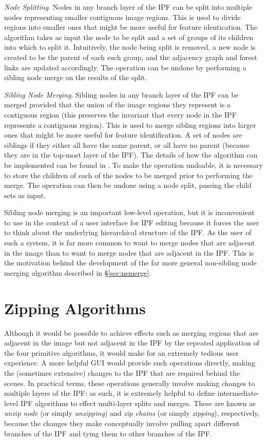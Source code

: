 \documentclass[a4paper]{article}
\begin{document}
\emph{Node Splitting}. Nodes in any branch layer of the IPF can be split into multiple nodes representing smaller contiguous image regions. This is used to divide regions into smaller ones that might be more useful for feature identication. The algorithm takes as input the node to be split and a set of groups of its children into which to split it. Intuitively, the node being split is removed, a new node is created to be the parent of each such group, and the adjacency graph and forest links are updated accordingly. The operation can be undone by performing a sibling node merge on the results of the split.

\emph{Sibling Node Merging}. Sibling nodes in any branch layer of the IPF can be merged provided that the union of the image regions they represent is a contiguous region (this preserves the invariant that every node in the IPF represents a contiguous region). This is used to merge sibling regions into larger ones that might be more useful for feature identification. A set of nodes are siblings if they either all have the same parent, or all have no parent (because they are in the top-most layer of the IPF). The details of how the algorithm can be implemented can be found in \cite{golodetz11}. To make the operation undoable, it is necessary to store the children of each of the nodes to be merged prior to performing the merge. The operation can then be undone using a node split, passing the child sets as input.

Sibling node merging is an important low-level operation, but it is inconvenient to use in the context of a user interface for IPF editing because it forces the user to think about the underlying hierarchical structure of the IPF. As the user of such a system, it is far more common to want to merge nodes that are adjacent in the image than to want to merge nodes that are adjacent in the IPF. This is the motivation behind the development of the far more general non-sibling node merging algorithm described in \S\ref{sec:nsmerge}.

\section{Zipping Algorithms}
\label{sec:zipping}

Although it would be possible to achieve effects such as merging regions that are adjacent in the image but not adjacent in the IPF by the repeated application of the four primitive algorithms, it would make for an extremely tedious user experience. A more helpful GUI would provide such operations directly, making the (sometimes extensive) changes to the IPF that are required behind the scenes. In practical terms, these operations generally involve making changes to multiple layers of the IPF: as such, it is extremely helpful to define intermediate-level IPF algorithms to effect multi-layer splits and merges. These are known as \emph{unzip node} (or simply \emph{unzipping}) and \emph{zip chains} (or simply \emph{zipping}), respectively, because the changes they make conceptually involve pulling apart different branches of the IPF and tying them to other branches of the IPF.
\end{document}
